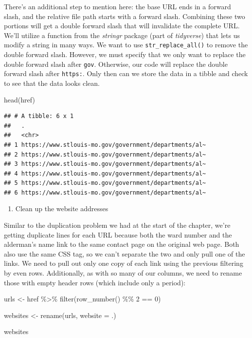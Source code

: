 \documentclass[
  krantz2]{krantz}
\makeatletter
\newenvironment{Shaded}{\begin{snugshade}}{\end{snugshade}}
\newcommand{\AttributeTok}[1]{\textcolor[rgb]{0.61,0.61,0.61}{#1}}
\newcommand{\DecValTok}[1]{\textcolor[rgb]{0.06,0.06,0.06}{#1}}
\newcommand{\FunctionTok}[1]{\textcolor[rgb]{0,0,0}{#1}}
\newcommand{\NormalTok}[1]{#1}
\newcommand{\OtherTok}[1]{\textcolor[rgb]{0.37,0.37,0.37}{#1}}
\newcommand{\SpecialCharTok}[1]{\textcolor[rgb]{0,0,0}{#1}}
\providecommand{\tightlist}{%
  \setlength{\itemsep}{0pt}\setlength{\parskip}{0pt}}
\newenvironment{kframe}{%
\medskip{}
\setlength{\fboxsep}{.8em}
 \def\at@end@of@kframe{}%
 \ifinner\ifhmode%
  \def\at@end@of@kframe{\end{minipage}}%
  \begin{minipage}{\columnwidth}%
 \fi\fi%
 \def\FrameCommand##1{\hskip\@totalleftmargin \hskip-\fboxsep
 \colorbox{shadecolor}{##1}\hskip-\fboxsep
     \hskip-\linewidth \hskip-\@totalleftmargin \hskip\columnwidth}%
 \MakeFramed {\advance\hsize-\width
   \@totalleftmargin\z@ \linewidth\hsize
   \@setminipage}}%
 {\par\unskip\endMakeFramed%
 \at@end@of@kframe}
\renewenvironment{Shaded}{\begin{kframe}}{\end{kframe}}
\makeatother
\begin{document}
There's an additional step to mention here: the base URL ends in a forward slash, and the relative file path starts with a forward slash. Combining these two portions will get a double forward slash that will invalidate the complete URL. We'll utilize a function from the \emph{stringr} package (part of \emph{tidyverse}) that lets us modify a string in many ways. We want to use \texttt{str\_replace\_all()} to remove the double forward slash. However, we must specify that we only want to replace the double forward slash after \texttt{gov}. Otherwise, our code will replace the double forward slash after \texttt{https:}. Only then can we store the data in a tibble and check to see that the data looks clean.

\begin{Shaded}
\begin{Highlighting}[]
\FunctionTok{head}\NormalTok{(href)}
\end{Highlighting}
\end{Shaded}

\begin{verbatim}
## # A tibble: 6 x 1
##   .
##   <chr>
## 1 https://www.stlouis-mo.gov/government/departments/al~
## 2 https://www.stlouis-mo.gov/government/departments/al~
## 3 https://www.stlouis-mo.gov/government/departments/al~
## 4 https://www.stlouis-mo.gov/government/departments/al~
## 5 https://www.stlouis-mo.gov/government/departments/al~
## 6 https://www.stlouis-mo.gov/government/departments/al~
\end{verbatim}

\begin{enumerate}
\def\labelenumi{\arabic{enumi}.}
\setcounter{enumi}{1}
\tightlist
\item
  Clean up the website addresses
\end{enumerate}

Similar to the duplication problem we had at the start of the chapter, we're getting duplicate lines for each URL because both the ward number and the alderman's name link to the same contact page on the original web page. Both also use the same CSS tag, so we can't separate the two and only pull one of the links. We need to pull out only one copy of each link using the previous filtering by even rows. Additionally, as with so many of our columns, we need to rename those with empty header rows (which include only a period):

\begin{Shaded}
\begin{Highlighting}[]
\NormalTok{urls }\OtherTok{\textless{}{-}}\NormalTok{ href }\SpecialCharTok{\%\textgreater{}\%}
  \FunctionTok{filter}\NormalTok{(}\FunctionTok{row\_number}\NormalTok{() }\SpecialCharTok{\%\%} \DecValTok{2} \SpecialCharTok{==} \DecValTok{0}\NormalTok{)}

\NormalTok{websites }\OtherTok{\textless{}{-}} \FunctionTok{rename}\NormalTok{(urls, }\AttributeTok{website =}\NormalTok{ .) }

\NormalTok{websites}
\end{Highlighting}
\end{Shaded}
\end{document}
